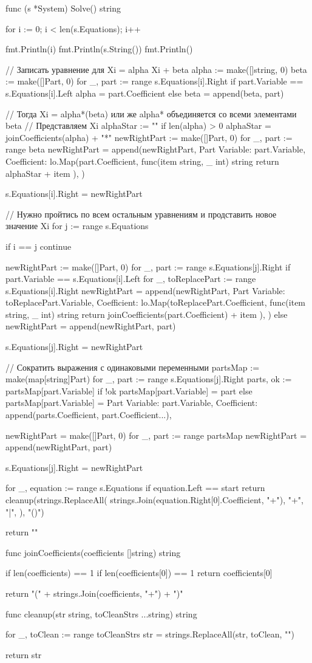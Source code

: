 func (s *System) Solve() string {
	for i := 0; i < len(s.Equations); i++ {
		fmt.Println(i)
		fmt.Println(s.String())
		fmt.Println()

		// Записать уравнение для Xi = alpha Xi + beta
		alpha := make([]string, 0)
		beta := make([]Part, 0)
		for _, part := range s.Equations[i].Right {
			if part.Variable == s.Equations[i].Left {
				alpha = part.Coefficient
			} else {
				beta = append(beta, part)
			}
		}

		// Тогда Xi = alpha*(beta) или же alpha* объединяется со всеми элементами beta
		// Представляем Xi
		alphaStar := ""
		if len(alpha) > 0 {
			alphaStar = joinCoefficients(alpha) + "*"
		}
		newRightPart := make([]Part, 0)
		for _, part := range beta {
			newRightPart = append(newRightPart, Part{
				Variable: part.Variable,
				Coefficient: lo.Map(part.Coefficient, func(item string, _ int) string {
					return alphaStar + item
				}),
			})
		}

		s.Equations[i].Right = newRightPart

		// Нужно пройтись по всем остальным уравнениям и продставить новое значение Xi
		for j := range s.Equations {
			if i == j {
				continue
			}

			newRightPart := make([]Part, 0)
			for _, part := range s.Equations[j].Right {
				if part.Variable == s.Equations[i].Left {
					for _, toReplacePart := range s.Equations[i].Right {
						newRightPart = append(newRightPart, Part{
							Variable: toReplacePart.Variable,
							Coefficient: lo.Map(toReplacePart.Coefficient, func(item string, _ int) string {
								return joinCoefficients(part.Coefficient) + item
							}),
						})
					}
				} else {
					newRightPart = append(newRightPart, part)
				}
			}

			s.Equations[j].Right = newRightPart

			// Сократить выражения с одинаковыми переменными
			partsMap := make(map[string]Part)
			for _, part := range s.Equations[j].Right {
				parts, ok := partsMap[part.Variable]
				if !ok {
					partsMap[part.Variable] = part
				} else {
					partsMap[part.Variable] = Part{
						Variable:    part.Variable,
						Coefficient: append(parts.Coefficient, part.Coefficient...),
					}
				}
			}

			newRightPart = make([]Part, 0)
			for _, part := range partsMap {
				newRightPart = append(newRightPart, part)
			}

			s.Equations[j].Right = newRightPart
		}
	}

	for _, equation := range s.Equations {
		if equation.Left == start {
			return cleanup(strings.ReplaceAll(
				strings.Join(equation.Right[0].Coefficient, "+"),
				"+", "|",
			), "()")
		}
	}

	return ""
}

func joinCoefficients(coefficients []string) string {
	if len(coefficients) == 1 {
		if len(coefficients[0]) == 1 {
			return coefficients[0]
		}
	}

	return "(" + strings.Join(coefficients, "+") + ")"
}

func cleanup(str string, toCleanStrs ...string) string {
	for _, toClean := range toCleanStrs {
		str = strings.ReplaceAll(str, toClean, "")
	}

	return str
}